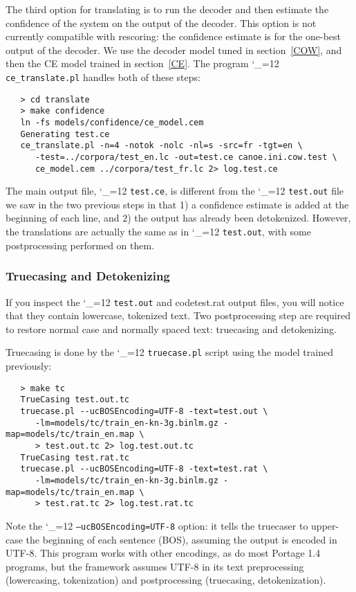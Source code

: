 \documentclass[11pt,letterpaper]{article}
\def\code{\begingroup\catcode`\_=12 \codex}
\newcommand{\codex}[1]{\texttt{#1}\endgroup}
\newcommand{\PS}{Portage 1.4\xspace}
\begin{document}
The third option for translating is to run the decoder and then estimate the
confidence of the system on the output of the decoder.  This option is not
currently compatible with rescoring: the confidence estimate is for the
one-best output of the decoder.  We use the decoder model tuned in
section~\ref{COW}, and then the CE model trained in section~\ref{CE}.  The
program \code{ce_translate.pl} handles both of these steps:
\begin{small}
\begin{verbatim}
   > cd translate
   > make confidence
   ln -fs models/confidence/ce_model.cem
   Generating test.ce
   ce_translate.pl -n=4 -notok -nolc -nl=s -src=fr -tgt=en \
      -test=../corpora/test_en.lc -out=test.ce canoe.ini.cow.test \
      ce_model.cem ../corpora/test_fr.lc 2> log.test.ce
\end{verbatim}
\end{small}
The main output file, \code{test.ce}, is different from the \code{test.out}
file we saw in the two previous steps in that 1) a confidence estimate is added
at the beginning of each line, and 2) the output has already been detokenized.
However, the translations are actually the same as in \code{test.out}, with
some postprocessing performed on them.

\subsubsection{Truecasing and Detokenizing} \label{Truecasing}

If you inspect the \code{test.out} and code{test.rat} output files, you will
notice that they contain lowercase, tokenized text. Two postprocessing step are 
required to restore normal case and normally spaced text: truecasing and
detokenizing.

Truecasing is done by the \code{truecase.pl} script using the model trained
previously:
\begin{small}
\begin{verbatim}
   > make tc
   TrueCasing test.out.tc
   truecase.pl --ucBOSEncoding=UTF-8 -text=test.out \
      -lm=models/tc/train_en-kn-3g.binlm.gz -map=models/tc/train_en.map \
      > test.out.tc 2> log.test.out.tc
   TrueCasing test.rat.tc
   truecase.pl --ucBOSEncoding=UTF-8 -text=test.rat \
      -lm=models/tc/train_en-kn-3g.binlm.gz -map=models/tc/train_en.map \
      > test.rat.tc 2> log.test.rat.tc
\end{verbatim}
\end{small}
Note the \code{--ucBOSEncoding=UTF-8} option: it tells the truecaser to
upper-case the beginning of each sentence (BOS), assuming the output is encoded
in UTF-8.  This program works with other encodings, as do most \PS programs,
but the framework assumes UTF-8 in its text preprocessing (lowercasing,
tokenization) and postprocessing (truecasing, detokenization).
\end{document}
